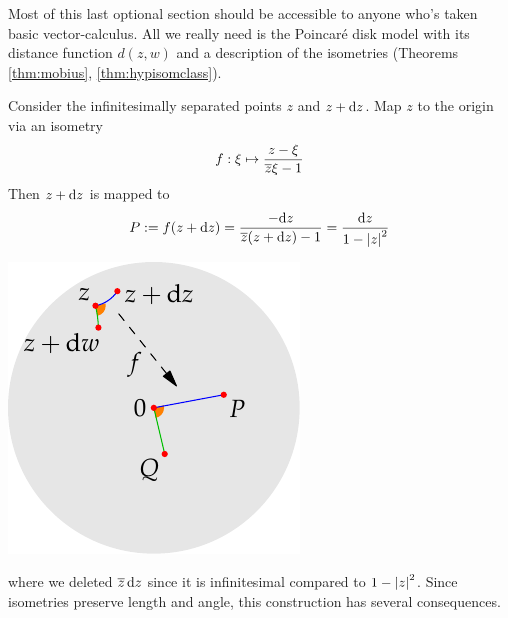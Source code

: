 

\vfil\goodbreak





\label{pg:hyp1stform}

Most of this last optional section should be accessible to anyone who's taken basic vector-calculus. All we really need is the Poincaré disk model with its distance function $d(z,w)$ and a description of the isometries (Theorems \ref{thm:mobius}, \ref{thm:hypisomclass}).\smallbreak

\begin{minipage}[t]{0.69\linewidth}\vspace{0pt}
	Consider the infinitesimally separated points $z$ and $z+{\mathrm{d} z}$. Map $z$ to the origin via an isometry
	\[
		f:\xi\mapsto \frac{z-\xi}{\overline{z}\xi-1}
	\]
	Then $z+{\mathrm{d} z}$ is mapped to
	\[
		P:=f(z+{\mathrm{d} z})=\frac{-{\mathrm{d} z}}{\overline{z}(z+{\mathrm{d} z})-1} =\frac{{\mathrm{d} z}}{1-\left| z\right|^2}
	\]
\end{minipage}
\hfill
\begin{minipage}[t]{0.3\linewidth}\vspace{0pt}
	\flushright\includegraphics[scale=0.9]{isom-arclength}
\end{minipage}
\medbreak
where we deleted $\overline{z}\,{\mathrm{d} z}$ since it is infinitesimal compared to $1-\left| z\right|^2$.\smallbreak
Since isometries preserve length and angle, this construction has several consequences.


